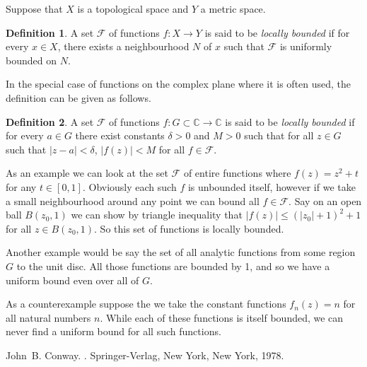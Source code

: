 \documentclass[12pt]{article}
\theoremstyle{theorem}
\theoremstyle{definition}
\newtheorem*{defn}{Definition}
\begin{document}
Suppose that $X$ is a topological space and $Y$ a metric space.  

\begin{defn}
A set ${\mathcal{F}}$
of functions $f\colon X \to Y$ is said to be {\em locally bounded} if for
every $x \in X$, there exists a neighbourhood $N$ of $x$ such that ${\mathcal{F}}$ is uniformly bounded on $N$.
\end{defn}

In the special case of functions on the complex plane where it
is often used, the definition can be given as follows.

\begin{defn}
A set ${\mathcal{F}}$ of functions $f\colon G \subset {\mathbb{C}} \to {\mathbb{C}}$ is said to be {\em locally bounded} if for every $a \in G$
there exist constants $\delta > 0$ and $M > 0$ such that for all
$z \in G$ such that $\lvert z-a \rvert < \delta$, $\lvert f(z) \rvert < M$ for all $f \in {\mathcal{F}}$.
\end{defn}

As an example we can look at the set ${\mathcal{F}}$ of entire functions where
$f(z) = z^2 + t$ for any $t \in [0,1]$.  Obviously each such $f$ is unbounded
itself, however if we take a small neighbourhood around any point we can
bound all $f \in {\mathcal{F}}$.  Say on an open ball $B(z_0,1)$ we can show
by triangle inequality that $\lvert f(z) \rvert \leq (\lvert z_0 \rvert +1)^2 + 1$
for all $z \in B(z_0,1)$.  So this set of functions is locally bounded.

Another example would be say the set of all analytic functions from
some region $G$ to the unit disc.  All those functions are bounded by 1,
and so we have a uniform bound even over all of $G$.

As a counterexample suppose the we take the constant functions $f_n(z) = n$ for
all natural numbers $n$.  While each of these functions is itself bounded,
we can never find a uniform bound for all such functions.

\begin{thebibliography}{9}
John~B. Conway.
{\em {}}.
Springer-Verlag, New York, New York, 1978.
\end{thebibliography}
\end{document}
